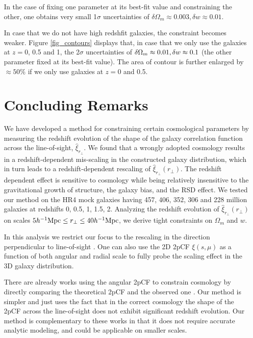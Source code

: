 \documentclass[iop]{emulateapj}
\begin{document}
In the case of fixing one parameter at its best-fit value and constraining the other,
one obtains very small 1$\sigma$ uncertainties of $\delta\Omega_m\approx0.003,\delta w\approx0.01$.

In case that we do not have high redshfit galaxies, the constraint becomes weaker.
Figure \ref{fig_contours} displays that, 
in case that we only use the galaxies at $z=$0, 0.5 and 1, 
the 2$\sigma$ uncertainties of $\delta\Omega_m\approx0.01,\\ \delta w\approx0.1$ (the other parameter fixed at its best-fit value).
The area of contour is further enlarged by $\approx 50\%$ if we only use galaxies at $z=$0 and 0.5.



\section{Concluding Remarks}
 
We have developed a method for constraining certain cosmological parameters by measuring the redshift evolution of the shape of the galaxy correlation function across the line-of-sight, $\hat \xi_{r_\perp}$.
We found that a wrongly adopted cosmology results in a redshift-dependent mis-scaling in the constructed galaxy distribution,
which in turn leads to a redshift-dependent rescaling of $\hat \xi_{r_\perp}(r_\perp)$.
The redshift dependent effect is sensitive to cosmology while being relatively insensitive to the gravitational growth of structure,
the galaxy bias, and the RSD effect.
We tested our method on the HR4 mock galaxies having 457, 406, 352, 306 and 228 million galaxies at redshifts 0, 0.5, 1, 1.5, 2.
Analyzing the redshift evolution of $\hat \xi_{r_\perp}(r_\perp)$ 
on scales $5  h^{-1} {\rm Mpc} \leq r_\perp \leq 40 h^{-1} {\rm Mpc}$, 
we derive tight constraints on $\Omega_m$ and $w$.

 
In this analysis we restrict our focus to the rescaling in the direction perpendicular to line-of-sight .
One can also use the 2D 2pCF $\xi(s,\mu)$ 
as a function of both angular and radial scale to fully probe the scaling effect in the 3D galaxy distribution.

There are already works using the angular 2pCF to constrain cosmology
by directly comparing the theoretical 2pCF and the observed one \citep{Salvador2014,Salvador2016}.
Our method is simpler and just uses the fact that in the correct cosmology the shape of the 2pCF across the line-of-sight
does not exhibit significant redshift evolution.
Our method is complementary to these works in that
it does not require accurate analytic modeling, 
and could be applicable on smaller scales.
\end{document}
